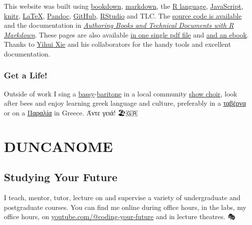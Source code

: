 \documentclass[
  12pt,
]{book}
\begin{document}
This website was built using \href{https://bookdown.org}{bookdown}, \href{https://en.wikipedia.org/wiki/Markdown}{markdown}, the \href{https://en.wikipedia.org/wiki/R_(programming_language)}{R language}, \href{https://en.wikipedia.org/wiki/JavaScript}{JavaScript}, \href{https://en.wikipedia.org/wiki/Knitr}{knitr}, \href{https://latex4year1.netlify.app}{LaTeX}, \href{https://en.wikipedia.org/wiki/Pandoc}{Pandoc}, \href{https://en.wikipedia.org/wiki/GitHub}{GitHub}, \href{https://en.wikipedia.org/wiki/RStudio}{RStudio} and TLC. The \href{https://github.com/dullhunk/duncanome}{source code is available} and the documentation in \emph{\href{https://bookdown.org/yihui/bookdown/}{Authoring Books and Technical Documents with R Markdown}}. These pages are also available \href{https://personalpages.manchester.ac.uk/staff/duncan.hull/duncan-hull.pdf}{in one single pdf file} and \href{https://personalpages.manchester.ac.uk/staff/duncan.hull/duncan-hull.epub}{and an ebook}. Thanks to \href{https://en.wikipedia.org/wiki/Yihui_Xie}{Yihui Xie} and his collaborators for the handy tools and excellent documentation. 🙏

\section*{Get a Life!}\label{get-a-life}

Outside of work I sing a \href{https://en.wikipedia.org/wiki/Bass_(voice_type)}{bassy}-\href{https://en.wikipedia.org/wiki/Baritone}{baritone} in a local community \href{https://en.wikipedia.org/wiki/Show_choir}{show choir}, look after bees and enjoy learning greek language and culture, preferably in a \href{https://en.wikipedia.org/wiki/Taverna}{ταβέρνα} or on a \href{https://en.wikipedia.org/wiki/Beach}{Παραλία} in Greece. Άντε γειά! 🏖️🇬🇷

\part{DUNCANOME}\label{part-duncanome}

\chapter{Studying Your Future}\label{teaching}

I teach, mentor, tutor, lecture on and supervise a variety of undergraduate and postgraduate courses. You can find me online during office hours, in the labs, my office hours, on \href{https://www.youtube.com/@coding-your-future}{youtube.com/@coding-your-future} and in lecture theatres. 🎭
\end{document}
